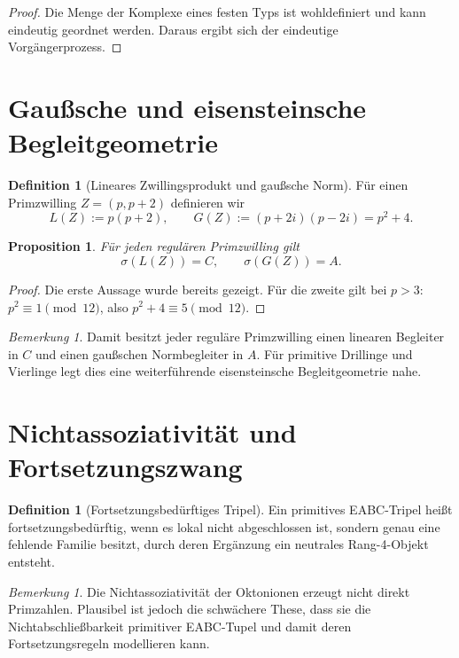 \documentclass[12pt,a4paper]{article}
\newtheorem{proposition}[satz]{Proposition}
\theoremstyle{definition}
\newtheorem{definition}[satz]{Definition}
\theoremstyle{remark}
\newtheorem{bemerkung}[satz]{Bemerkung}
\newcommand{\signatur}{\sigma}
\begin{document}
	\begin{proof}
		Die Menge der Komplexe eines festen Typs ist wohldefiniert und kann eindeutig geordnet werden. Daraus ergibt sich der eindeutige Vorgängerprozess.
	\end{proof}
	
	\section{Gaußsche und eisensteinsche Begleitgeometrie}
	
	\begin{definition}[Lineares Zwillingsprodukt und gaußsche Norm]
		Für einen Primzwilling \(Z=(p,p+2)\) definieren wir
		\[
		L(Z):=p(p+2),
		\qquad
		G(Z):=(p+2i)(p-2i)=p^2+4.
		\]
	\end{definition}
	
	\begin{proposition}
		Für jeden regulären Primzwilling gilt
		\[
		\signatur(L(Z))=C,
		\qquad
		\signatur(G(Z))=A.
		\]
	\end{proposition}
	
	\begin{proof}
		Die erste Aussage wurde bereits gezeigt. Für die zweite gilt bei \(p>3\): \(p^2\equiv1\pmod{12}\), also \(p^2+4\equiv5\pmod{12}\).
	\end{proof}
	
	\begin{bemerkung}
		Damit besitzt jeder reguläre Primzwilling einen linearen Begleiter in \(C\) und einen gaußschen Normbegleiter in \(A\). Für primitive Drillinge und Vierlinge legt dies eine weiterführende eisensteinsche Begleitgeometrie nahe.
	\end{bemerkung}
	
	\section{Nichtassoziativität und Fortsetzungszwang}
	
	\begin{definition}[Fortsetzungsbedürftiges Tripel]
		Ein primitives EABC-Tripel heißt fortsetzungsbedürftig, wenn es lokal nicht abgeschlossen ist, sondern genau eine fehlende Familie besitzt, durch deren Ergänzung ein neutrales Rang-4-Objekt entsteht.
	\end{definition}
	
	\begin{bemerkung}
		Die Nichtassoziativität der Oktonionen erzeugt nicht direkt Primzahlen. Plausibel ist jedoch die schwächere These, dass sie die Nichtabschließbarkeit primitiver EABC-Tupel und damit deren Fortsetzungsregeln modellieren kann.
	\end{bemerkung}
	
\end{document}

